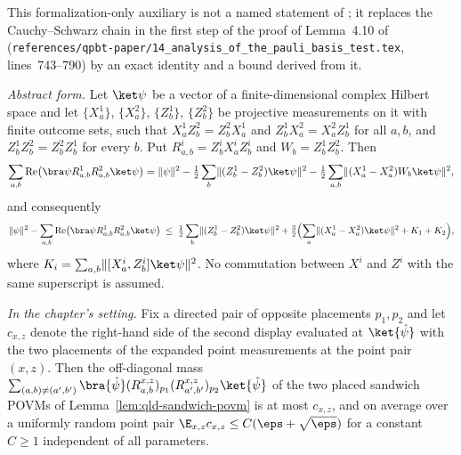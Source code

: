 \begin{lemma}
	\label{lem:qld-sandwich-consistency-defect}
	\leanok
	This formalization-only auxiliary is not a named statement of
	\cite{Ji2020MIPStar}; it replaces the Cauchy--Schwarz chain in the first
	step of the proof of Lemma~4.10 of \cite{Ji2020MIPStar}
	(\texttt{references/qpbt-paper/14\_analysis\_of\_the\_pauli\_basis\_test.tex},
	lines~743--790) by an exact identity and a bound derived from it.

	\emph{Abstract form.} Let $\ket\psi$ be a vector of a finite-dimensional
	complex Hilbert space and let $\{X^1_a\}$, $\{X^2_a\}$, $\{Z^1_b\}$,
	$\{Z^2_b\}$ be projective measurements on it with finite outcome sets,
	such that $X^1_a Z^2_b = Z^2_b X^1_a$ and $Z^1_b X^2_a = X^2_a Z^1_b$ for
	all $a, b$, and $Z^1_b Z^2_b = Z^2_b Z^1_b$ for every $b$. Put
	$R^i_{a,b} = Z^i_b X^i_a Z^i_b$ and $W_b = Z^1_b Z^2_b$. Then
	\[
		\sum_{a,b} \operatorname{Re}\!\left(\bra\psi R^1_{a,b} R^2_{a,b} \ket\psi\right)
		= \lVert\psi\rVert^2
		- \tfrac12 \sum_b \lVert (Z^1_b - Z^2_b)\ket\psi \rVert^2
		- \tfrac12 \sum_{a,b} \lVert (X^1_a - X^2_a) W_b \ket\psi \rVert^2 ,
	\]
	and consequently
	\[
		\lVert\psi\rVert^2
		- \sum_{a,b} \operatorname{Re}\!\left(\bra\psi R^1_{a,b} R^2_{a,b} \ket\psi\right)
		\;\le\; \tfrac12 \sum_b \lVert (Z^1_b - Z^2_b)\ket\psi \rVert^2
		+ \tfrac32 \Bigl( \sum_a \lVert (X^1_a - X^2_a)\ket\psi \rVert^2
		+ K_1 + K_2 \Bigr) ,
	\]
	where $K_i = \sum_{a,b} \lVert [X^i_a, Z^i_b] \ket\psi \rVert^2$. No
	commutation between $X^i$ and $Z^i$ with the same superscript is assumed.

	\emph{In the chapter's setting.} Fix a directed pair of opposite
	placements $p_1, p_2$ and let $c_{x,z}$ denote the right-hand side of the
	second display evaluated at $\ket{\hat\psi}$ with the two placements of the
	expanded point measurements at the point pair $(x,z)$. Then the
	off-diagonal mass
	$\sum_{(a,b) \ne (a',b')} \bra{\hat\psi} (R^{x,z}_{a,b})_{p_1}
	(R^{x,z}_{a',b'})_{p_2} \ket{\hat\psi}$ of the two placed sandwich POVMs
	of Lemma~\ref{lem:qld-sandwich-povm} is at most $c_{x,z}$, and on average
	over a uniformly random point pair $\E_{x,z} c_{x,z} \le C(\eps+\sqrt\eps)$
	for a constant $C \ge 1$ independent of all parameters.
\end{lemma}
